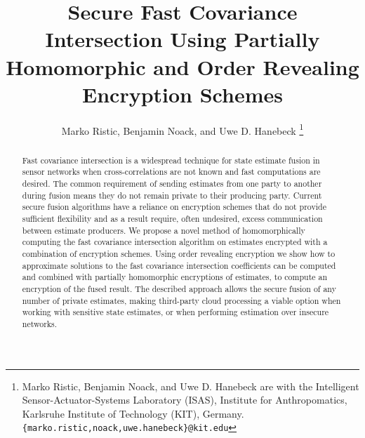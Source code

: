 \documentclass[letterpaper, 10 pt, conference]{ieeeconf}  %
\title{\LARGE \bf
Secure Fast Covariance Intersection Using Partially Homomorphic and Order Revealing Encryption Schemes
}
\author{Marko Ristic, Benjamin Noack, and Uwe D. Hanebeck%
\thanks{Marko Ristic, Benjamin Noack, and Uwe D. Hanebeck are with the Intelligent Sensor-Actuator-Systems Laboratory (ISAS), Institute for Anthropomatics, Karlsruhe Institute of Technology (KIT), Germany.\newline
{\tt\small \{marko.ristic,noack,uwe.hanebeck\}@kit.edu}%
}%
}
\begin{document}
\maketitle
\thispagestyle{empty}
\pagestyle{empty}




\begin{abstract}

Fast covariance intersection is a widespread technique for state estimate fusion in sensor networks when cross-correlations are not known and fast computations are desired. The common requirement of sending estimates from one party to another during fusion means they do not remain private to their producing party. Current secure fusion algorithms have a reliance on encryption schemes that do not provide sufficient flexibility and as a result require, often undesired, excess communication between estimate producers. We propose a novel method of homomorphically computing the fast covariance intersection algorithm on estimates encrypted with a combination of encryption schemes. Using order revealing encryption we show how to approximate solutions to the fast covariance intersection coefficients can be computed and combined with partially homomorphic encryptions of estimates, to compute an encryption of the fused result. The described approach allows the secure fusion of any number of private estimates, making third-party cloud processing a viable option when working with sensitive state estimates, or when performing estimation over insecure networks.

\end{abstract}



\end{document}
